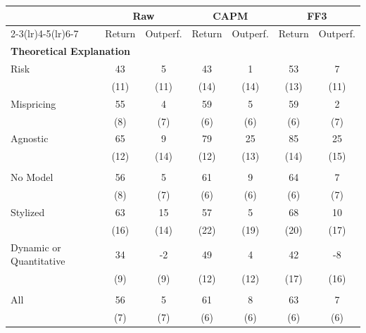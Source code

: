 \begin{tabular}{lcccccc}
   \toprule
   & \multicolumn{2}{c}{Raw} & \multicolumn{2}{c}{CAPM} & \multicolumn{2}{c}{FF3} \\
   \cmidrule(lr){2-3}\cmidrule(lr){4-5}\cmidrule(lr){6-7}
   & Return & Outperf. & Return & Outperf. & Return & Outperf. \\
   \midrule
   \multicolumn{7}{l}{\textbf{Theoretical Explanation}} \\
   Risk & 43 & 5 & 43 & 1 & 53 & 7 \\
   & (11) & (11) & (14) & (14) & (13) & (11) \\
   Mispricing & 55 & 4 & 59 & 5 & 59 & 2 \\
   & (8) & (7) & (6) & (6) & (6) & (7) \\
   Agnostic & 65 & 9 & 79 & 25 & 85 & 25 \\
   & (12) & (14) & (12) & (13) & (14) & (15) \\
   \addlinespace
   \multicolumn{7}{l}{\textbf{Modeling Formalism}} \\
   No Model & 56 & 5 & 61 & 9 & 64 & 7 \\
   & (8) & (7) & (6) & (6) & (6) & (7) \\
   Stylized & 63 & 15 & 57 & 5 & 68 & 10 \\
   & (16) & (14) & (22) & (19) & (20) & (17) \\
   Dynamic or Quantitative & 34 & -2 & 49 & 4 & 42 & -8 \\
   & (9) & (9) & (12) & (12) & (17) & (16) \\
   \addlinespace
   \multicolumn{7}{l}{\textbf{Overall}} \\
   All & 56 & 5 & 61 & 8 & 63 & 7 \\
   & (7) & (7) & (6) & (6) & (6) & (6) \\
   \bottomrule
\end{tabular}
